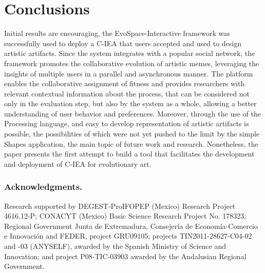 \documentclass{llncs}
\begin{document}
\section{Conclusions}
\label{sec:conclusions}
Initial results are encouraging, the EvoSpace-Interactive framework was successfully used to deploy a C-IEA that users accepted and used to design artistic artifacts.
Since the system integrates with a popular social network, the framework promotes the collaborative evolution of artistic memes,
leveraging the insights of multiple users in a parallel and asynchronous manner. The platform enables the collaborative assignment of fitness and provides researchers with relevant contextual information about the process, that can be considered not only in the evaluation step, but also by the system as a whole, allowing a better understanding of user behavior and preferences.
Moreover, through the use of the Processing language, and easy to develop representation of artistic artifacts is possible,
the possibilities of which were not yet pushed to the limit by the simple Shapes application, the main topic of future work and research. Nonetheless, the paper presents the first attempt to build a tool that facilitates the development and deployment of C-IEA for evolutionary art.

\subsubsection*{Acknowledgments.}
\begin{small}
Research supported by DEGEST-ProIFOPEP (Mexico) Research Project 4616.12-P;
CONACYT (Mexico) Basic Science Research Project No. 178323;
Regional Government Junta de Extremadura, Consejer\'ia de Econom\'ia-Comercio e Innovaci\'on and FEDER, project GRU09105;
projects TIN2011-28627-C04-02 and -03 (ANYSELF),
awarded by the Spanish Ministry of Science and Innovation;
and project P08-TIC-03903 awarded by the Andalusian Regional Government.
\end{small}




\begin{footnotesize}

\end{footnotesize}
\end{document}
